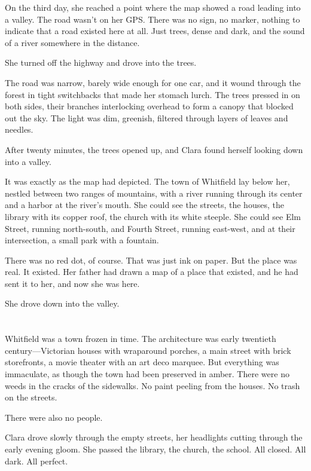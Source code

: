 \documentclass[
    language=english,
    doctype=short-story,
    institution=none,
]{../../omnilatex}
\begin{document}
On the third day, she reached a point where the map showed a road leading into a valley. The road wasn't on her GPS. There was no sign, no marker, nothing to indicate that a road existed here at all. Just trees, dense and dark, and the sound of a river somewhere in the distance.

She turned off the highway and drove into the trees.

The road was narrow, barely wide enough for one car, and it wound through the forest in tight switchbacks that made her stomach lurch. The trees pressed in on both sides, their branches interlocking overhead to form a canopy that blocked out the sky. The light was dim, greenish, filtered through layers of leaves and needles.

After twenty minutes, the trees opened up, and Clara found herself looking down into a valley.

It was exactly as the map had depicted. The town of Whitfield lay below her, nestled between two ranges of mountains, with a river running through its center and a harbor at the river's mouth. She could see the streets, the houses, the library with its copper roof, the church with its white steeple. She could see Elm Street, running north-south, and Fourth Street, running east-west, and at their intersection, a small park with a fountain.

There was no red dot, of course. That was just ink on paper. But the place was real. It existed. Her father had drawn a map of a place that existed, and he had sent it to her, and now she was here.

She drove down into the valley.

\section*{}

Whitfield was a town frozen in time. The architecture was early twentieth century---Victorian houses with wraparound porches, a main street with brick storefronts, a movie theater with an art deco marquee. But everything was immaculate, as though the town had been preserved in amber. There were no weeds in the cracks of the sidewalks. No paint peeling from the houses. No trash on the streets.

There were also no people.

Clara drove slowly through the empty streets, her headlights cutting through the early evening gloom. She passed the library, the church, the school. All closed. All dark. All perfect.
\end{document}
